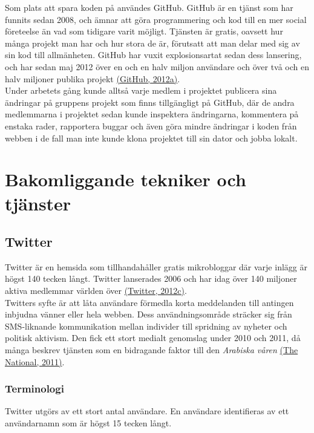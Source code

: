 \documentclass[a4paper,11pt]{article}
\begin{document}
Som plats att spara koden på användes GitHub. GitHub är en tjänst som har funnits sedan 2008, och ämnar att göra programmering och kod till en mer social företeelse än vad som tidigare varit möjligt. Tjänsten är gratis, oavsett hur många projekt man har och hur stora de är, förutsatt att man delar med sig av sin kod till allmänheten. GitHub har vuxit explosionsartat sedan dess lansering, och har sedan maj 2012 över en och en halv miljon användare och över två och en halv miljoner publika projekt \hyperref[github]{(GitHub, 2012a)}.\\

Under arbetets gång kunde alltså varje medlem i projektet publicera sina ändringar på gruppens projekt som finns tillgängligt på GitHub, där de andra medlemmarna i projektet sedan kunde inspektera ändringarna, kommentera på enstaka rader, rapportera buggar och även göra mindre ändringar i koden från webben i de fall man inte kunde klona projektet till sin dator och jobba lokalt.

\section{Bakomliggande tekniker och tjänster}

\subsection{Twitter}
Twitter är en hemsida som tillhandahåller gratis mikrobloggar där varje inlägg är högst 140 tecken långt. Twitter lanserades 2006 och har idag över 140 miljoner aktiva medlemmar världen över \hyperref[twitter]{(Twitter, 2012c)}.\\

Twitters syfte är att låta användare förmedla korta meddelanden till antingen inbjudna vänner eller hela webben. Dess användningsområde sträcker sig från SMS-liknande kommunikation mellan individer till spridning av nyheter och politisk aktivism. Den fick ett stort medialt genomslag under 2010 och 2011, då många beskrev tjänsten som en bidragande faktor till den {\it Arabiska våren} \hyperref[national]{(The National, 2011)}.\\

\subsubsection{Terminologi}
Twitter utgörs av ett stort antal användare. En användare identifieras av ett användarnamn som är högst 15 tecken långt. \\
\end{document}
